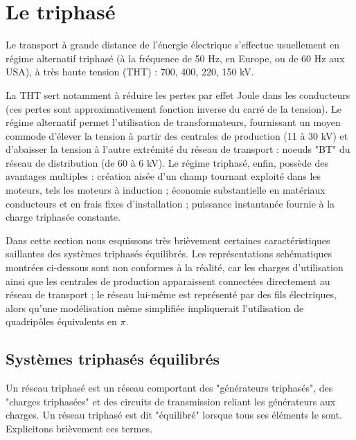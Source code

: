 \section{Le triphasé}
Le transport à grande distance de l'énergie électrique s'effectue usuellement en régime
alternatif triphasé (à la fréquence de 50 Hz, en Europe, ou de 60
Hz aux USA), à très haute tension (THT) : 700, 400, 220, 150 kV.

La THT sert notamment à réduire les pertes par effet Joule dans les conducteurs (ces pertes sont approximativement fonction inverse du carré de la tension). Le régime alternatif permet l'utilisation de transformateurs, fournissant un moyen commode d'élever la tension à partir des centrales de production (11 à 30 kV) et d'abaisser la tension à l'autre extrémité du réseau de transport : noeuds "BT" du réseau de distribution (de 60 à 6 kV). Le régime triphasé, enfin, possède des avantages multiples : création aisée d'un champ tournant exploité dans les moteurs, tels les moteurs à induction ; économie substantielle en matériaux conducteurs et en frais fixes d'installation ; puissance instantanée fournie à la charge triphasée constante.

Dans cette section nous esquissons très brièvement certaines caractéristiques saillantes des systèmes triphasés équilibrés. Les  représentations schématiques montrées ci-dessous sont  non conformes à la réalité, car les charges d'utilisation ainsi que les centrales de production apparaissent connectées directement au réseau de transport ; le réseau lui-même est représenté par des fils électriques, alors qu'une modélisation même simplifiée impliquerait l'utilisation de quadripôles équivalents en $\pi$.

\subsection{Systèmes triphasés équilibrés}
Un réseau triphasé est un réseau comportant des "générateurs triphasés", des "charges triphasées" et des circuits de transmission reliant les générateurs aux charges. Un réseau triphasé est dit "équilibré" lorsque tous ses éléments le sont. Explicitons brièvement ces termes.

